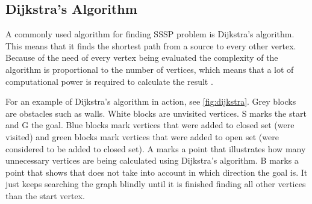 





  \subsection{Dijkstra's Algorithm}\label{subs_dijkstra}


  A commonly used algorithm for finding SSSP problem is Dijkstra's algorithm. This means that it finds the shortest path from a source to every other vertex. Because of the need of every vertex being evaluated the complexity of the algorithm is proportional to the number of vertices, which means that a lot of computational power is required to calculate the result \cite{Dijkstr1959}.

  For an example of Dijkstra's algorithm in action, see \cref{fig:dijkstra}. Grey blocks are obstacles such as walls. White blocks are unvisited vertices. S marks the start and G the goal. Blue blocks mark vertices that were added to closed set (were visited) and green blocks mark vertices that were added to open set (were considered to be added to closed set).  A marks a point that illustrates how many unnecessary vertices are being calculated using Dijkstra's algorithm. B marks a point that shows that does not take into account in which direction the goal is. It just keeps searching the graph blindly until it is finished finding all other vertices than the start vertex.

